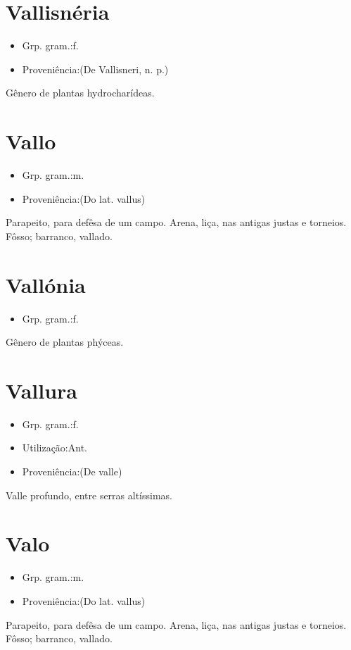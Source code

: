\documentclass{article}
\begin{document}
\section{Vallisnéria}
\begin{itemize}
\item {Grp. gram.:f.}
\end{itemize}
\begin{itemize}
\item {Proveniência:(De \textunderscore Vallisneri\textunderscore , n. p.)}
\end{itemize}
Gênero de plantas hydrocharídeas.
\section{Vallo}
\begin{itemize}
\item {Grp. gram.:m.}
\end{itemize}
\begin{itemize}
\item {Proveniência:(Do lat. \textunderscore vallus\textunderscore )}
\end{itemize}
Parapeito, para defêsa de um campo.
Arena, liça, nas antigas justas e torneios.
Fôsso; barranco, vallado.
\section{Vallónia}
\begin{itemize}
\item {Grp. gram.:f.}
\end{itemize}
Gênero de plantas phýceas.
\section{Vallura}
\begin{itemize}
\item {Grp. gram.:f.}
\end{itemize}
\begin{itemize}
\item {Utilização:Ant.}
\end{itemize}
\begin{itemize}
\item {Proveniência:(De \textunderscore valle\textunderscore )}
\end{itemize}
Valle profundo, entre serras altíssimas.
\section{Valo}
\begin{itemize}
\item {Grp. gram.:m.}
\end{itemize}
\begin{itemize}
\item {Proveniência:(Do lat. \textunderscore vallus\textunderscore )}
\end{itemize}
Parapeito, para defêsa de um campo.
Arena, liça, nas antigas justas e torneios.
Fôsso; barranco, vallado.
\end{document}
